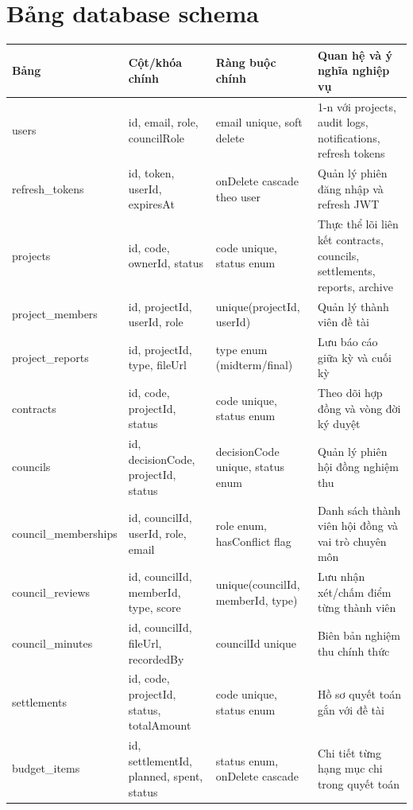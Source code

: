 \documentclass[12pt,a4paper]{report}
\begin{document}
\section{Bảng database schema}
\begin{table}[H]
\centering
\scriptsize
\begin{tabular}{|L{2.8cm}|L{3.0cm}|L{3.0cm}|L{4.4cm}|}
\hline
\textbf{Bảng} & \textbf{Cột/khóa chính} & \textbf{Ràng buộc chính} & \textbf{Quan hệ và ý nghĩa nghiệp vụ} \\ \hline
users & id, email, role, councilRole & email unique, soft delete & 1-n với projects, audit logs, notifications, refresh tokens \\ \hline
refresh\_tokens & id, token, userId, expiresAt & onDelete cascade theo user & Quản lý phiên đăng nhập và refresh JWT \\ \hline
projects & id, code, ownerId, status & code unique, status enum & Thực thể lõi liên kết contracts, councils, settlements, reports, archive \\ \hline
project\_members & id, projectId, userId, role & unique(projectId, userId) & Quản lý thành viên đề tài \\ \hline
project\_reports & id, projectId, type, fileUrl & type enum (midterm/final) & Lưu báo cáo giữa kỳ và cuối kỳ \\ \hline
contracts & id, code, projectId, status & code unique, status enum & Theo dõi hợp đồng và vòng đời ký duyệt \\ \hline
councils & id, decisionCode, projectId, status & decisionCode unique, status enum & Quản lý phiên hội đồng nghiệm thu \\ \hline
council\_\newline memberships & id, councilId, userId, role, email & role enum, hasConflict flag & Danh sách thành viên hội đồng và vai trò chuyên môn \\ \hline
council\_reviews & id, councilId, memberId, type, score & unique(councilId, memberId, type) & Lưu nhận xét/chấm điểm từng thành viên \\ \hline
council\_minutes & id, councilId, fileUrl, recordedBy & councilId unique & Biên bản nghiệm thu chính thức \\ \hline
settlements & id, code, projectId, status, totalAmount & code unique, status enum & Hồ sơ quyết toán gắn với đề tài \\ \hline
budget\_items & id, settlementId, planned, spent, status & status enum, onDelete cascade & Chi tiết từng hạng mục chi trong quyết toán \\ \hline

\end{tabular}
\end{table}
\end{document}
